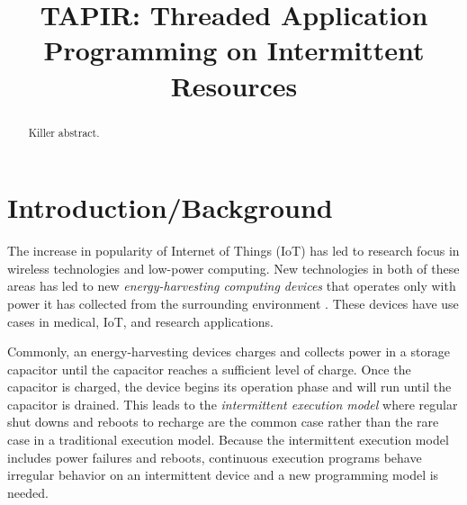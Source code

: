 \documentclass[11pt]{sensys-proc}
\title{TAPIR: Threaded Application Programming on Intermittent Resources}
\begin{document}
\maketitle

\begin{abstract}
Killer abstract.
\end{abstract}


\section{Introduction/Background}
  \label{sec:intro}

The increase in popularity of Internet of Things (IoT) has led to research focus
in wireless technologies and low-power computing.  New technologies in both of
these areas has led to new \textit{energy-harvesting computing devices} that
operates only with power it has collected from the surrounding environment
\cite{Chain}. These devices have use cases in medical, IoT, and research
applications.

Commonly, an energy-harvesting devices charges and collects power in a storage
capacitor until the capacitor reaches a sufficient level of charge.  Once the
capacitor is charged, the device begins its operation phase and will run until
the capacitor is drained.  This leads to the \textit{intermittent execution
model} where regular shut downs and reboots to recharge are the common case
rather than the rare case in a traditional execution model. Because the
intermittent execution model includes power failures and reboots, continuous
execution programs behave irregular behavior on an intermittent device and a new
programming model is needed.
\end{document}
